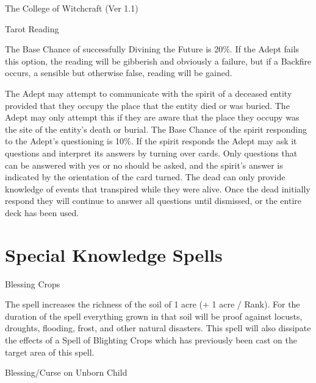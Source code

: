 \begin{Chapter}{The College of Witchcraft (Ver 1.1)}
\begin{ritual}[Q-2]{Tarot Reading}
\begin{effects}
\begin{Description}
  The Base Chance of successfully Divining the Future is 20\%.  If the
  Adept fails this option, the reading will be gibberish and obviously
  a failure, but if a Backfire occurs, a sensible but otherwise false,
  reading will be gained.

\item[Questioning the Dead] The Adept may attempt to communicate with
  the spirit of a deceased entity provided that they occupy the place
  that the entity died or was buried.  The Adept may only attempt this
  if they are aware that the place they occupy was the site of the
  entity’s death or burial.  The Base Chance of the spirit responding
  to the Adept’s questioning is 10\%. If the spirit responds the Adept
  may ask it questions and interpret its answers by turning over
  cards.  Only questions that can be answered with yes or no should be
  asked, and the spirit’s answer is indicated by the orientation of
  the card turned. The dead can only provide knowledge of events that
  transpired while they were alive.  Once the dead initially respond
  they will continue to answer all questions until dismissed, or the
  entire deck has been used.
\end{Description}
\end{effects}
\end{ritual}


\section{Special Knowledge Spells}

\begin{spell}[S-1]{Blessing Crops}

\begin{effects}
The spell increases the richness of the soil of 1 acre (+ 1 acre /
Rank). For the duration of the spell everything grown in that soil
will be proof against locusts, droughts, flooding, frost, and other
natural disasters.  This spell will also dissipate the effects of a
Spell of Blighting Crops which has previously been cast on the target
area of this spell.
\end{effects}
\end{spell}

\begin{spell}[S-2]{Blessing/Curse on Unborn Child}


\end{spell}
\end{Chapter}
